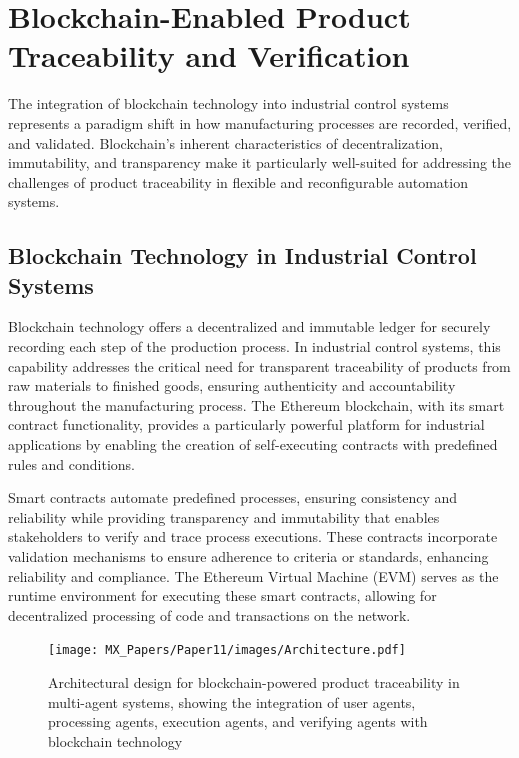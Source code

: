 \section{Blockchain-Enabled Product Traceability and Verification}

The integration of blockchain technology into industrial control systems represents a paradigm shift in how manufacturing processes are recorded, verified, and validated. Blockchain's inherent characteristics of decentralization, immutability, and transparency make it particularly well-suited for addressing the challenges of product traceability in flexible and reconfigurable automation systems.

\subsection{Blockchain Technology in Industrial Control Systems}

Blockchain technology offers a decentralized and immutable ledger for securely recording each step of the production process. In industrial control systems, this capability addresses the critical need for transparent traceability of products from raw materials to finished goods, ensuring authenticity and accountability throughout the manufacturing process. The Ethereum blockchain, with its smart contract functionality, provides a particularly powerful platform for industrial applications by enabling the creation of self-executing contracts with predefined rules and conditions.

Smart contracts automate predefined processes, ensuring consistency and reliability while providing transparency and immutability that enables stakeholders to verify and trace process executions. These contracts incorporate validation mechanisms to ensure adherence to criteria or standards, enhancing reliability and compliance. The Ethereum Virtual Machine (EVM) serves as the runtime environment for executing these smart contracts, allowing for decentralized processing of code and transactions on the network.

\begin{figure}[h]
    \centering
    \texttt{[image: MX\_Papers/Paper11/images/Architecture.pdf]}
    \caption{Architectural design for blockchain-powered product traceability in multi-agent systems, showing the integration of user agents, processing agents, execution agents, and verifying agents with blockchain technology}
    \label{fig:blockchain_architecture}
\end{figure}

